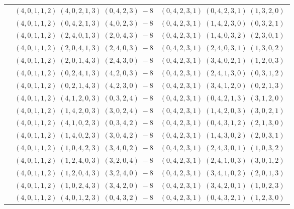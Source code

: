 \documentclass[11pt]{article}
\begin{document}
\begin{longtable}[l]{|c|c|c|}
 \cline{2-3} 
 & $(4 ,0 ,1 ,1 ,2) \;(4 ,0 ,2 ,1 ,3) \;(0 ,4 ,2 ,3) \;-8$ & $(0 ,4 ,2 ,3 ,1) \;(0 ,4 ,2 ,3 ,1) \;(1 ,3 ,2 ,0) \;$\\ 
 \cline{2-3} 
 & $(4 ,0 ,1 ,1 ,2) \;(0 ,4 ,2 ,1 ,3) \;(4 ,0 ,2 ,3) \;-8$ & $(0 ,4 ,2 ,3 ,1) \;(1 ,4 ,2 ,3 ,0) \;(0 ,3 ,2 ,1) \;$\\ 
 \cline{2-3} 
 & $(4 ,0 ,1 ,1 ,2) \;(2 ,4 ,0 ,1 ,3) \;(2 ,0 ,4 ,3) \;-8$ & $(0 ,4 ,2 ,3 ,1) \;(1 ,4 ,0 ,3 ,2) \;(2 ,3 ,0 ,1) \;$\\ 
 \cline{2-3} 
 & $(4 ,0 ,1 ,1 ,2) \;(2 ,0 ,4 ,1 ,3) \;(2 ,4 ,0 ,3) \;-8$ & $(0 ,4 ,2 ,3 ,1) \;(2 ,4 ,0 ,3 ,1) \;(1 ,3 ,0 ,2) \;$\\ 
 \cline{2-3} 
 & $(4 ,0 ,1 ,1 ,2) \;(2 ,0 ,1 ,4 ,3) \;(2 ,4 ,3 ,0) \;-8$ & $(0 ,4 ,2 ,3 ,1) \;(3 ,4 ,0 ,2 ,1) \;(1 ,2 ,0 ,3) \;$\\ 
 \cline{2-3} 
 & $(4 ,0 ,1 ,1 ,2) \;(0 ,2 ,4 ,1 ,3) \;(4 ,2 ,0 ,3) \;-8$ & $(0 ,4 ,2 ,3 ,1) \;(2 ,4 ,1 ,3 ,0) \;(0 ,3 ,1 ,2) \;$\\ 
 \cline{2-3} 
 & $(4 ,0 ,1 ,1 ,2) \;(0 ,2 ,1 ,4 ,3) \;(4 ,2 ,3 ,0) \;-8$ & $(0 ,4 ,2 ,3 ,1) \;(3 ,4 ,1 ,2 ,0) \;(0 ,2 ,1 ,3) \;$\\ 
 \cline{2-3} 
 & $(4 ,0 ,1 ,1 ,2) \;(4 ,1 ,2 ,0 ,3) \;(0 ,3 ,2 ,4) \;-8$ & $(0 ,4 ,2 ,3 ,1) \;(0 ,4 ,2 ,1 ,3) \;(3 ,1 ,2 ,0) \;$\\ 
 \cline{2-3} 
 & $(4 ,0 ,1 ,1 ,2) \;(1 ,4 ,2 ,0 ,3) \;(3 ,0 ,2 ,4) \;-8$ & $(0 ,4 ,2 ,3 ,1) \;(1 ,4 ,2 ,0 ,3) \;(3 ,0 ,2 ,1) \;$\\ 
 \cline{2-3} 
 & $(4 ,0 ,1 ,1 ,2) \;(4 ,1 ,0 ,2 ,3) \;(0 ,3 ,4 ,2) \;-8$ & $(0 ,4 ,2 ,3 ,1) \;(0 ,4 ,3 ,1 ,2) \;(2 ,1 ,3 ,0) \;$\\ 
 \cline{2-3} 
 & $(4 ,0 ,1 ,1 ,2) \;(1 ,4 ,0 ,2 ,3) \;(3 ,0 ,4 ,2) \;-8$ & $(0 ,4 ,2 ,3 ,1) \;(1 ,4 ,3 ,0 ,2) \;(2 ,0 ,3 ,1) \;$\\ 
 \cline{2-3} 
 & $(4 ,0 ,1 ,1 ,2) \;(1 ,0 ,4 ,2 ,3) \;(3 ,4 ,0 ,2) \;-8$ & $(0 ,4 ,2 ,3 ,1) \;(2 ,4 ,3 ,0 ,1) \;(1 ,0 ,3 ,2) \;$\\ 
 \cline{2-3} 
 & $(4 ,0 ,1 ,1 ,2) \;(1 ,2 ,4 ,0 ,3) \;(3 ,2 ,0 ,4) \;-8$ & $(0 ,4 ,2 ,3 ,1) \;(2 ,4 ,1 ,0 ,3) \;(3 ,0 ,1 ,2) \;$\\ 
 \cline{2-3} 
 & $(4 ,0 ,1 ,1 ,2) \;(1 ,2 ,0 ,4 ,3) \;(3 ,2 ,4 ,0) \;-8$ & $(0 ,4 ,2 ,3 ,1) \;(3 ,4 ,1 ,0 ,2) \;(2 ,0 ,1 ,3) \;$\\ 
 \cline{2-3} 
 & $(4 ,0 ,1 ,1 ,2) \;(1 ,0 ,2 ,4 ,3) \;(3 ,4 ,2 ,0) \;-8$ & $(0 ,4 ,2 ,3 ,1) \;(3 ,4 ,2 ,0 ,1) \;(1 ,0 ,2 ,3) \;$\\ 
 \cline{2-3} 
 & $(4 ,0 ,1 ,1 ,2) \;(4 ,0 ,1 ,2 ,3) \;(0 ,4 ,3 ,2) \;-8$ & $(0 ,4 ,2 ,3 ,1) \;(0 ,4 ,3 ,2 ,1) \;(1 ,2 ,3 ,0) \;$\\ 

\end{longtable}
\end{document}
